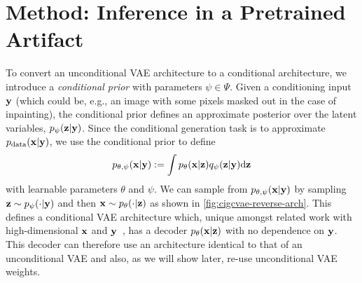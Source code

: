 \section{Method: Inference in a Pretrained Artifact}
To convert an unconditional VAE architecture to a conditional architecture, we
introduce a \textit{conditional prior} with parameters $\psi\in\Psi$.
Given a conditioning input ${\mathbf{y}}$ (which could be, e.g., an image with some
pixels masked out in the case of inpainting), the conditional prior defines an
approximate posterior over the latent variables,
$p_\psi({\mathbf{z}}|{\mathbf{y}})$.
%
Since the conditional generation task is
to approximate $p_{\rm{data}}({\mathbf{x}}|{\mathbf{y}})$, we use the conditional prior to define
\begin{equation}
  \label{eq:marginal-image-posterior}
  p_{\theta,\psi}({\mathbf{x}}|{\mathbf{y}}) := \int p_\theta({\mathbf{x}}|{\mathbf{z}})q_\psi({\mathbf{z}}|{\mathbf{y}}) \mathrm{d}{\mathbf{z}}
\end{equation}
with learnable parameters $\theta$ and $\psi$. We can sample from
$p_{\theta,\psi}({\mathbf{x}}|{\mathbf{y}})$ by sampling ${\mathbf{z}}\sim p_\psi(\cdot|{\mathbf{y}})$ and then
${\mathbf{x}}\sim p_\theta(\cdot|{\mathbf{z}})$ as shown in \cref{fig:cigcvae-reverse-arch}. This defines
a conditional VAE architecture which, unique amongst related work with
high-dimensional ${\mathbf{x}}$ and
${\mathbf{y}}$~\citep{sohn2015learning,zheng2019pluralistic,ivanov2018variational,wan2021high},
has a decoder $p_\theta({\mathbf{x}}|{\mathbf{z}})$ with no dependence on ${\mathbf{y}}$. This
decoder can therefore use an architecture identical to that of an unconditional
VAE and also, as we will show later, re-use unconditional VAE weights.

